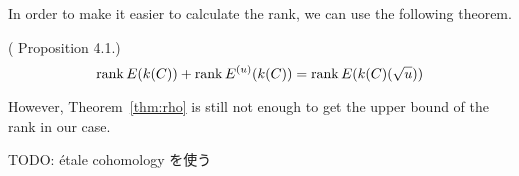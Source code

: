 \documentclass[main]{subfiles}
\begin{document}
In order to make it easier to calculate the rank, we can use the following theorem.

\begin{thm}{(\cite{ref:naskrecki2013} Proposition 4.1.)}
    \begin{equation}
        \operatorname{rank} E(k(C)) + \operatorname{rank} E^{(u)}(k(C)) = \operatorname{rank} E(k(C)(\sqrt{u}))
    \end{equation}
\end{thm}

However, Theorem~\ref{thm:rho} is still not enough to get the upper bound of the rank in our case.

TODO: \'etale cohomology を使う
\end{document}
